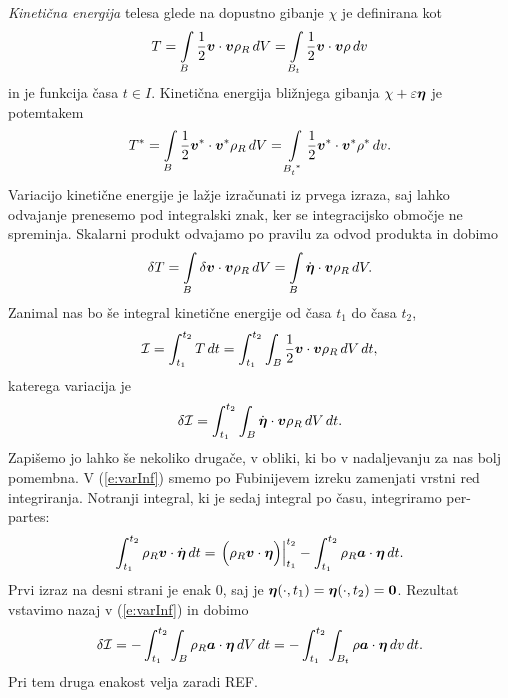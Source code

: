 \emph{Kinetična energija} telesa glede na dopustno gibanje $\chi$ je definirana kot
\begin{equation*}
	T = \int\limits_{B}\frac{1}{2}\boldsymbol v\cdot\boldsymbol v\rho_R\, dV =
	\int\limits_{B_t}\frac{1}{2}\boldsymbol v\cdot\boldsymbol v\rho\, dv
\end{equation*}
in je funkcija časa $t\in I$. Kinetična energija bližnjega gibanja $\chi+\varepsilon\boldsymbol \eta$
je potemtakem
\begin{equation*}
	T^* = \int\limits_{B}\frac{1}{2}\vek{v}^*\cdot\vek{v}^*\rho_R\, dV =
	\int\limits_{\bottop{B}{t}{*}}\frac{1}{2}\vek{v}^*\cdot\vek{v}^*\rho^*\, dv.
\end{equation*}
Variacijo kinetične energije je lažje izračunati iz prvega izraza, saj lahko odvajanje prenesemo pod
integralski znak, ker se integracijsko območje ne spreminja. Skalarni produkt odvajamo
po pravilu za odvod produkta in dobimo
\[
	\delta T =
	\int\limits_{B}\delta\boldsymbol v\cdot\boldsymbol v\rho_R\, dV=
	\int\limits_{B}\dot{\boldsymbol \eta}\cdot\boldsymbol v\rho_R\, dV.
\]
Zanimal nas bo še integral kinetične energije od časa $t_1$ do časa $t_2$,
\[ \mathcal{I}=\int_{t_1}^{t_2} T\,dt=\int_{t_1}^{t_2} \int_{B}\frac{1}{2}\boldsymbol v\cdot\boldsymbol v\rho_R\, dV \,dt, \]
katerega variacija je
\begin{equation}\label{e:varInf}
	\delta \mathcal{I}=\int_{t_1}^{t_2}\int_{B}\dot{\boldsymbol \eta}\cdot\boldsymbol v\rho_R\, dV\, dt.
\end{equation}
Zapišemo jo lahko še nekoliko drugače, v obliki, ki bo v nadaljevanju za nas bolj pomembna.
V (\ref{e:varInf}) smemo po Fubinijevem izreku zamenjati vrstni red integriranja.
Notranji integral, ki je sedaj integral po času, integriramo per-partes:
\[
	\int_{t_1}^{t_2}\rho_R\boldsymbol v\cdot\dot{\boldsymbol \eta}\, dt =
	\left.\Big(\rho_R\boldsymbol v\cdot\boldsymbol \eta\Big)\right|_{t_1}^{t_2}-
	\int_{t_1}^{t_2}\rho_R\boldsymbol a\cdot\boldsymbol \eta\,dt.
\]
Prvi izraz na desni strani je enak 0, saj je $\boldsymbol \eta(\cdot,t_1)=\boldsymbol \eta(\cdot,t_2)=\boldsymbol 0$.
Rezultat vstavimo nazaj v (\ref{e:varInf}) in dobimo
\begin{equation*}
	\delta \mathcal{I} =
	-\int_{t_1}^{t_2}\int_{B}\rho_R\boldsymbol a\cdot\boldsymbol \eta\, dV\, dt=
	-\int_{t_1}^{t_2}\int_{B_t}\rho\boldsymbol a\cdot\boldsymbol \eta\, dv\, dt.
\end{equation*}
Pri tem druga enakost velja zaradi REF.


